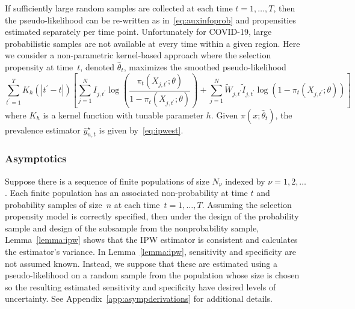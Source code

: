 \documentclass[11pt]{amsart}
\numberwithin{equation}{section}
\theoremstyle{plain}
\begin{document}
If sufficiently large random samples are collected at each time $t =1,\ldots,T$, then the pseudo-likelihood can be re-written as in~\eqref{eq:auxinfoprob} and propensities estimated separately per time point.  Unfortunately for COVID-19, large probabilistic samples are not available at every time within a given region.  Here we consider a non-parametric kernel-based approach where the selection propensity at time~$t$, denoted $\hat \theta_t$, maximizes the smoothed pseudo-likelihood
$$
\sum_{t^\prime=1}^T K_h(|t^\prime - t|) \left[ \sum_{j=1}^N I_{j,t^\prime} \log \left( \frac{\pi_t (X_{j,t^\prime}; \theta)}{1-\pi_t(X_{j,t^\prime}; \theta)} \right) + \sum_{j=1}^N \tilde W_{j,t^\prime} \tilde I_{j,t^\prime} \log \left( 1 - \pi_t (X_{j,t^\prime}; \theta) \right) \right]
$$
where $K_h$ is a kernel function with tunable parameter $h$. Given $\pi (x;\hat \theta_t)$, the prevalence estimator $\bar y_{n,t}^\star$ is given by~\ref{eq:ipwest}.


%
%
%
%
%
%
%
%
\subsubsection{Asymptotics}

Suppose there is a sequence of finite populations of size $N_{\nu}$ indexed by $\nu=1,2,\ldots$. Each finite population has an associated non-probability at time $t$ and probability samples of size~$n$ at each time~$t=1,\ldots,T$. Assuming the selection propensity model is correctly specified, then under the design of the probability sample and design of the subsample from the nonprobability sample, Lemma~\ref{lemma:ipw} shows that the IPW estimator is  consistent and calculates the estimator's variance.  In Lemma~\ref{lemma:ipw}, sensitivity and specificity are not assumed known.  Instead, we suppose that these are estimated using a pseudo-likelihood on a random sample from the population whose size is chosen so the resulting estimated sensitivity and specificity have desired levels of uncertainty.  See Appendix~\ref{app:asympderivations} for additional details.
\end{document}
